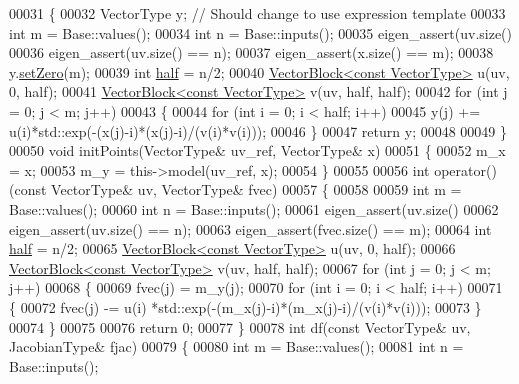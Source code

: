 \begin{DoxyCode}
00031   \{
00032     VectorType y; \textcolor{comment}{// Should change to use expression template}
00033     \textcolor{keywordtype}{int} m = Base::values(); 
00034     \textcolor{keywordtype}{int} n = Base::inputs();
00035     eigen\_assert(uv.size()%
00036     eigen\_assert(uv.size() == n);
00037     eigen\_assert(x.size() == m);
00038     y.\hyperlink{class_eigen_1_1_plain_object_base_ac21ad5f989f320e46958b75ac8d9a1da}{setZero}(m);
00039     \textcolor{keywordtype}{int} \hyperlink{struct_eigen_1_1half}{half} = n/2;
00040     \hyperlink{group___core___module_class_eigen_1_1_vector_block}{VectorBlock<const VectorType>} u(uv, 0, half);
00041     \hyperlink{group___core___module_class_eigen_1_1_vector_block}{VectorBlock<const VectorType>} v(uv, half, half);
00042     \textcolor{keywordflow}{for} (\textcolor{keywordtype}{int} j = 0; j < m; j++)
00043     \{
00044       \textcolor{keywordflow}{for} (\textcolor{keywordtype}{int} i = 0; i < half; i++)
00045         y(j) += u(i)*std::exp(-(x(j)-i)*(x(j)-i)/(v(i)*v(i)));
00046     \}
00047     \textcolor{keywordflow}{return} y;
00048     
00049   \}
00050   \textcolor{keywordtype}{void} initPoints(VectorType& uv\_ref, VectorType& x)
00051   \{
00052     m\_x = x;
00053     m\_y = this->model(uv\_ref, x);
00054   \}
00055   
00056   \textcolor{keywordtype}{int} operator()(\textcolor{keyword}{const} VectorType& uv, VectorType& fvec)
00057   \{
00058     
00059     \textcolor{keywordtype}{int} m = Base::values(); 
00060     \textcolor{keywordtype}{int} n = Base::inputs();
00061     eigen\_assert(uv.size()%
00062     eigen\_assert(uv.size() == n);
00063     eigen\_assert(fvec.size() == m);
00064     \textcolor{keywordtype}{int} \hyperlink{struct_eigen_1_1half}{half} = n/2;
00065     \hyperlink{group___core___module_class_eigen_1_1_vector_block}{VectorBlock<const VectorType>} u(uv, 0, half);
00066     \hyperlink{group___core___module_class_eigen_1_1_vector_block}{VectorBlock<const VectorType>} v(uv, half, half);
00067     \textcolor{keywordflow}{for} (\textcolor{keywordtype}{int} j = 0; j < m; j++)
00068     \{
00069       fvec(j) = m\_y(j);
00070       \textcolor{keywordflow}{for} (\textcolor{keywordtype}{int} i = 0; i < half; i++)
00071       \{
00072         fvec(j) -= u(i) *std::exp(-(m\_x(j)-i)*(m\_x(j)-i)/(v(i)*v(i)));
00073       \}
00074     \}
00075     
00076     \textcolor{keywordflow}{return} 0;
00077   \}
00078   \textcolor{keywordtype}{int} df(\textcolor{keyword}{const} VectorType& uv, JacobianType& fjac)
00079   \{
00080     \textcolor{keywordtype}{int} m = Base::values(); 
00081     \textcolor{keywordtype}{int} n = Base::inputs();

\end{DoxyCode}
